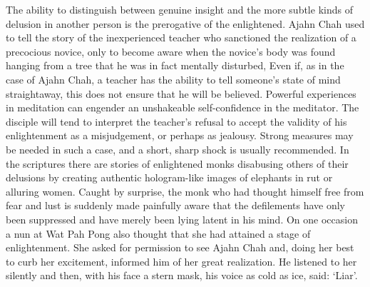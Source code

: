 The ability to distinguish between genuine insight and the more subtle
kinds of delusion in another person is the prerogative of the
enlightened. Ajahn Chah used to tell the story of the inexperienced
teacher who sanctioned the realization of a precocious novice, only to
become aware when the novice's body was found hanging from a tree that
he was in fact mentally disturbed, Even if, as in the case of Ajahn
Chah, a teacher has the ability to tell someone's state of mind
straightaway, this does not ensure that he will be believed. Powerful
experiences in meditation can engender an unshakeable self-confidence in
the meditator. The disciple will tend to interpret the teacher's refusal
to accept the validity of his enlightenment as a misjudgement, or
perhaps as jealousy. Strong measures may be needed in such a case, and a
short, sharp shock is usually recommended. In the scriptures there are
stories of enlightened monks disabusing others of their delusions by
creating authentic hologram-like images of elephants in rut or alluring
women. Caught by surprise, the monk who had thought himself free from
fear and lust is suddenly made painfully aware that the defilements have
only been suppressed and have merely been lying latent in his mind. On
one occasion a nun at Wat Pah Pong also thought that she had attained a
stage of enlightenment. She asked for permission to see Ajahn Chah and, 
doing her best to curb her excitement, informed him of her great
realization. He listened to her silently and then, with his face a stern
mask, his voice as cold as ice, said: `Liar'.

